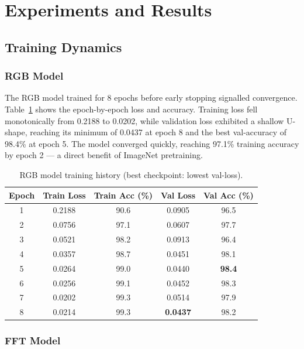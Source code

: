 \documentclass[12pt, a4paper]{article}
\begin{document}
\section{Experiments and Results}
\label{sec:experiments}

\subsection{Training Dynamics}

\subsubsection{RGB Model}

The RGB model trained for 8 epochs before early stopping signalled convergence.
Table~\ref{tab:rgb_history} shows the epoch-by-epoch loss and accuracy.
Training loss fell monotonically from 0.2188 to 0.0202, while validation loss
exhibited a shallow U-shape, reaching its minimum of 0.0437 at epoch 8 and
the best val-accuracy of 98.4\% at epoch 5.  The model converged quickly,
reaching 97.1\% training accuracy by epoch 2 — a direct benefit of
ImageNet pretraining.

\begin{table}[H]
\centering
\caption{RGB model training history (best checkpoint: lowest val-loss).}
\label{tab:rgb_history}
\begin{tabular}{ccccc}
\toprule
\textbf{Epoch} & \textbf{Train Loss} & \textbf{Train Acc (\%)} &
\textbf{Val Loss} & \textbf{Val Acc (\%)} \\
\midrule
1 & 0.2188 & 90.6 & 0.0905 & 96.5 \\
2 & 0.0756 & 97.1 & 0.0607 & 97.7 \\
3 & 0.0521 & 98.2 & 0.0913 & 96.4 \\
4 & 0.0357 & 98.7 & 0.0451 & 98.1 \\
5 & 0.0264 & 99.0 & 0.0440 & \textbf{98.4} \\
6 & 0.0256 & 99.1 & 0.0452 & 98.3 \\
7 & 0.0202 & 99.3 & 0.0514 & 97.9 \\
8 & 0.0214 & 99.3 & \textbf{0.0437} & 98.2 \\
\bottomrule
\end{tabular}
\end{table}

\subsubsection{FFT Model}
\end{document}
